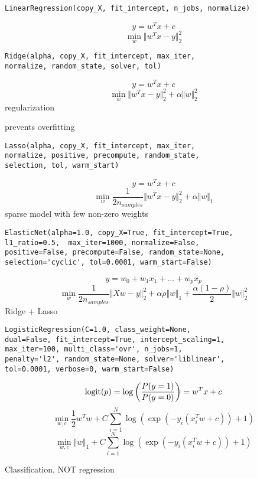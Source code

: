\documentclass[landscape]{slides}
\begin{document}
\begin{slide}
\begin{verbatim}
LinearRegression(copy_X, fit_intercept, n_jobs, normalize)
\end{verbatim}
$$ y = w^T x + c $$
$$ \min_w \Vert w^T x-y \Vert_2^2 $$
\end{slide}

\begin{slide}
\begin{verbatim}
Ridge(alpha, copy_X, fit_intercept, max_iter,
normalize, random_state, solver, tol)
\end{verbatim}
$$ y = w^T x + c $$
$$ \min_w \Vert w^Tx-y \Vert_2^2 + \alpha \Vert w \Vert_2^2 $$
regularization

prevents overfitting
\end{slide}

\begin{slide}
\begin{verbatim}
Lasso(alpha, copy_X, fit_intercept, max_iter,
normalize, positive, precompute, random_state,
selection, tol, warm_start)
\end{verbatim}
$$ y = w^T x + c $$
$$ \min_w \frac 1{2n_{samples}} \Vert w^T x-y \Vert_2^2 + \alpha \Vert w \Vert_1 $$
sparse model with few non-zero weights
\end{slide}

\begin{slide}
\begin{verbatim}
ElasticNet(alpha=1.0, copy_X=True, fit_intercept=True,
l1_ratio=0.5,  max_iter=1000, normalize=False,
positive=False, precompute=False, random_state=None,
selection='cyclic', tol=0.0001, warm_start=False)
\end{verbatim}
$$ y = w_0 + w_1 x_1 + \ldots + w_p x_p $$
$$ \min_w \frac 1{2n_{samples}} \Vert Xw-y \Vert_2^2 + \alpha \rho \Vert w \Vert_1 + \frac{\alpha(1-\rho)}2 \Vert w \Vert_2^2 $$
Ridge + Lasso
\end{slide}


\begin{slide}
\begin{verbatim}
LogisticRegression(C=1.0, class_weight=None,
dual=False, fit_intercept=True, intercept_scaling=1,
max_iter=100, multi_class='ovr', n_jobs=1,
penalty='l2', random_state=None, solver='liblinear',
tol=0.0001, verbose=0, warm_start=False)
\end{verbatim}
$$ {\rm logit}(p) = \log\left( \frac{P(y=1)}{P(y=0)} \right)
= w^T x + c $$
$$ \min_{w,c} \frac 12 w^T w + C\sum_{i=1}^N \log(\exp(-y_i(x_i^Tw+c))+1) $$
$$ \min_{w,c} \Vert w\Vert_1 + C\sum_{i=1}^N \log(\exp(-y_i(x_i^Tw+c))+1) $$

Classification, NOT regression
\end{slide}
\end{document}
